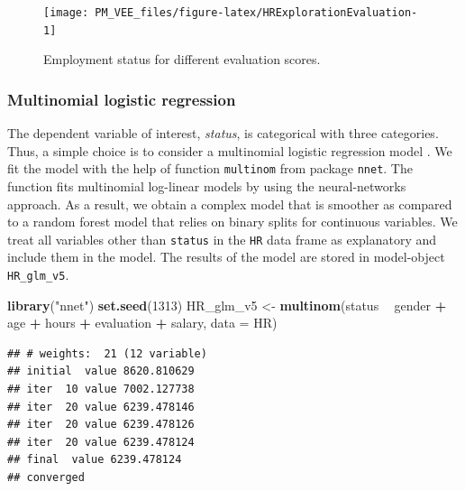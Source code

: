 \documentclass[12pt,]{krantz}
\newenvironment{Shaded}{\begin{snugshade}}{\end{snugshade}}
\newcommand{\DataTypeTok}[1]{\textcolor[rgb]{0.13,0.29,0.53}{#1}}
\newcommand{\DecValTok}[1]{\textcolor[rgb]{0.00,0.00,0.81}{#1}}
\newcommand{\KeywordTok}[1]{\textcolor[rgb]{0.13,0.29,0.53}{\textbf{#1}}}
\newcommand{\NormalTok}[1]{#1}
\newcommand{\OperatorTok}[1]{\textcolor[rgb]{0.81,0.36,0.00}{\textbf{#1}}}
\newcommand{\StringTok}[1]{\textcolor[rgb]{0.31,0.60,0.02}{#1}}
\begin{document}
\begin{figure}

{\centering \texttt{[image: PM\_VEE\_files/figure-latex/HRExplorationEvaluation-1]} 

}

\caption{Employment status for different evaluation scores.}\label{fig:HRExplorationEvaluation}
\end{figure}

\hypertarget{model-HR-mr}{%
\subsubsection{Multinomial logistic regression}\label{model-HR-mr}}

The dependent variable of interest, \emph{status}, is categorical with three categories. Thus, a simple choice is to consider a multinomial logistic regression model \citep{Venables2010}. We fit the model with the help of function \texttt{multinom} from package \texttt{nnet}. The function fits multinomial log-linear models by using the neural-networks approach. As a result, we obtain a complex model that is smoother as compared to a random forest model that relies on binary splits for continuous variables. We treat all variables other than \texttt{status} in the \texttt{HR} data frame as explanatory and include them in the model. The results of the model are stored in model-object \texttt{HR\_glm\_v5}.

\begin{Shaded}
\begin{Highlighting}[]
\KeywordTok{library}\NormalTok{(}\StringTok{"nnet"}\NormalTok{)}
\KeywordTok{set.seed}\NormalTok{(}\DecValTok{1313}\NormalTok{)}
\NormalTok{HR_glm_v5 <-}\StringTok{ }\KeywordTok{multinom}\NormalTok{(status }\OperatorTok{~}\StringTok{ }\NormalTok{gender }\OperatorTok{+}\StringTok{ }\NormalTok{age }\OperatorTok{+}\StringTok{ }\NormalTok{hours }\OperatorTok{+}\StringTok{ }\NormalTok{evaluation }\OperatorTok{+}\StringTok{ }\NormalTok{salary, }\DataTypeTok{data =}\NormalTok{ HR)}
\end{Highlighting}
\end{Shaded}

\begin{verbatim}
## # weights:  21 (12 variable)
## initial  value 8620.810629 
## iter  10 value 7002.127738
## iter  20 value 6239.478146
## iter  20 value 6239.478126
## iter  20 value 6239.478124
## final  value 6239.478124 
## converged
\end{verbatim}
\end{document}

